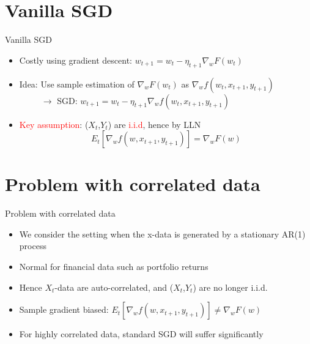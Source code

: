 \documentclass{beamer}
\begin{document}
\section{Vanilla SGD}
\begin{frame}{Vanilla SGD}
\begin{itemize}
    \item Costly using gradient descent: $w_{t+1}=w_t-\eta_{t+1}\nabla_w F(w_t)$\\
    \item Idea: Use sample estimation of $\nabla_w F(w_t)$ as $\nabla_w f(w_t,x_{t+1},y_{t+1})$
    \\$\;\;\;\;\;\;\;\;\;\rightarrow$ SGD: $w_{t+1}=w_t-\eta_{t+1}\nabla_w f(w_t,x_{t+1},y_{t+1})$
    \item \textcolor{red}{Key assumption}: ($X_t$,$Y_t$) are \textcolor{red}{i.i.d}, hence by LLN
    \begin{equation*}
        E_t[\nabla_w f(w,x_{t+1},y_{t+1})]=\nabla_w F(w)
    \end{equation*}
\end{itemize}
\end{frame}

\section{Problem with correlated data}
\begin{frame}{Problem with correlated data}
    \begin{itemize}
        \item We consider the setting when the x-data is generated by a stationary AR(1) process
        \item Normal for financial data such as portfolio returns
        \item Hence $X_t$-data are auto-correlated, and ($X_t$,$Y_t$) are no longer i.i.d.
        \item Sample gradient biased: $E_t[\nabla_w f(w,x_{t+1},y_{t+1})]\neq \nabla_w F(w)$
        \item For highly correlated data, standard SGD will suffer significantly
    \end{itemize}
\end{frame}
\end{document}

